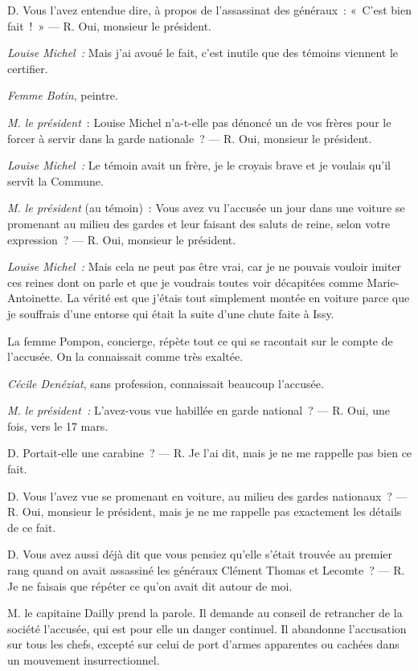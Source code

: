 \documentclass[french,twoside]{book} %
\begin{document}
D. Vous l’avez entendue dire, à propos de l’assassinat des généraux : « C’est bien fait ! » — R. Oui, monsieur le président.\par
\emph{Louise Michel :} Mais j’ai avoué le fait, c’est inutile que des témoins viennent le certifier.\par
\bigbreak
\noindent \emph{Femme Botin}, peintre.\par
\emph{M. le président} : Louise Michel n’a-t-elle pas dénoncé un de vos frères pour le forcer à servir dans la garde nationale ? — R. Oui, monsieur le président.\par
\emph{Louise Michel :} Le témoin avait un frère, je le croyais brave et je voulais qu’il servît la Commune.\par
\emph{M. le président} (au témoin) : Vous avez vu l’accusée un jour dans une voiture se promenant au milieu des gardes et leur faisant des saluts de reine, selon votre expression ? — R. Oui, monsieur le président.\par
\emph{Louise Michel :} Mais cela ne peut pas être vrai, car je ne pouvais vouloir imiter ces reines dont on parle et que je voudrais toutes voir décapitées comme Marie-Antoinette. La vérité est que j’étais tout simplement montée en voiture parce que je souffrais d’une entorse qui était la suite d’une chute faite à Issy.\par
La femme Pompon, concierge, répète tout ce qui se racontait sur le compte de l’accusée. On la connaissait comme très exaltée.\par
\emph{Cécile Denéziat}, sans profession, connaissait beaucoup l’accusée.\par
 \emph{M. le président :} L’avez-vous vue habillée en garde national ? — R. Oui, une fois, vers le 17 mars.\par
D. Portait-elle une carabine ? — R. Je l’ai dit, mais je ne me rappelle pas bien ce fait.\par
D. Vous l’avez vue se promenant en voiture, au milieu des gardes nationaux ? — R. Oui, monsieur le président, mais je ne me rappelle pas exactement les détails de ce fait.\par
D. Vous avez aussi déjà dit que vous pensiez qu’elle s’était trouvée au premier rang quand on avait assassiné les généraux Clément Thomas et Lecomte ? — R. Je ne faisais que répéter ce qu’on avait dit autour de moi.\par
\bigbreak
\noindent M. le capitaine Dailly prend la parole. Il demande au conseil de retrancher de la société l’accusée, qui est pour elle un danger continuel. Il abandonne l’accusation sur tous les chefs, excepté sur celui de port d’armes apparentes ou cachées dans un mouvement insurrectionnel.\par
\end{document}
